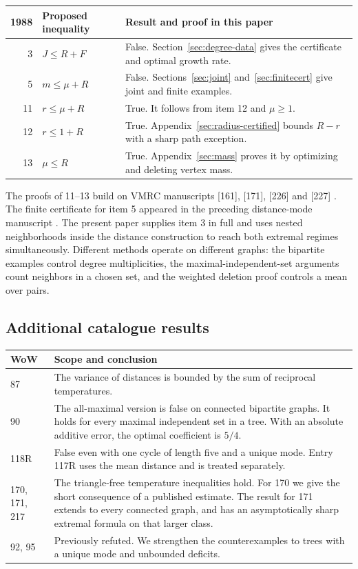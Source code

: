 \documentclass[11pt,a4paper]{article}
\theoremstyle{remark}\newtheorem*{remark}{Remark}
\begin{document}
\smallskip\noindent\begin{tabularx}{\linewidth}{@{}r l X@{}}\toprule
1988 & Proposed inequality & Result and proof in this paper\\\midrule
3 & $J\le R+F$ & False. Section~\ref{sec:degree-data} gives the certificate and optimal growth rate.\\
5 & $m\le\mu+R$ & False. Sections~\ref{sec:joint} and~\ref{sec:finitecert} give joint and finite examples.\\
11 & $r\le\mu+R$ & True. It follows from item 12 and $\mu\ge1$.\\
12 & $r\le1+R$ & True. Appendix~\ref{sec:radius-certified} bounds $R-r$ with a sharp path exception.\\
13 & $\mu\le R$ & True. Appendix~\ref{sec:mass} proves it by optimizing and deleting vertex mass.\\\bottomrule
\end{tabularx}

\medskip\noindent The proofs of 11--13 build on VMRC manuscripts [161], [171], [226] and [227] \cite{cat-rad,cat-harm,audited,mass-audit}. The finite certificate for item 5 appeared in the preceding distance-mode manuscript \cite{earlier-modes}. The present paper supplies item 3 in full and uses nested neighborhoods inside the distance construction to reach both extremal regimes simultaneously. Different methods operate on different graphs: the bipartite examples control degree multiplicities, the maximal-independent-set arguments count neighbors in a chosen set, and the weighted deletion proof controls a mean over pairs.

\subsection*{Additional catalogue results}
\begin{tabularx}{\linewidth}{@{}l X@{}}\toprule
WoW & Scope and conclusion\\\midrule
87 & The variance of distances is bounded by the sum of reciprocal temperatures.\\
90 & The all-maximal version is false on connected bipartite graphs. It holds for every maximal independent set in a tree. With an absolute additive error, the optimal coefficient is $5/4$.\\
118R & False even with one cycle of length five and a unique mode. Entry 117R uses the mean distance and is treated separately.\\
170, 171, 217 & The triangle-free temperature inequalities hold. For 170 we give the short consequence of a published estimate. The result for 171 extends to every connected graph, and has an asymptotically sharp extremal formula on that larger class.\\
92, 95 & Previously refuted. We strengthen the counterexamples to trees with a unique mode and unbounded deficits.\\\bottomrule
\end{tabularx}
\end{document}
